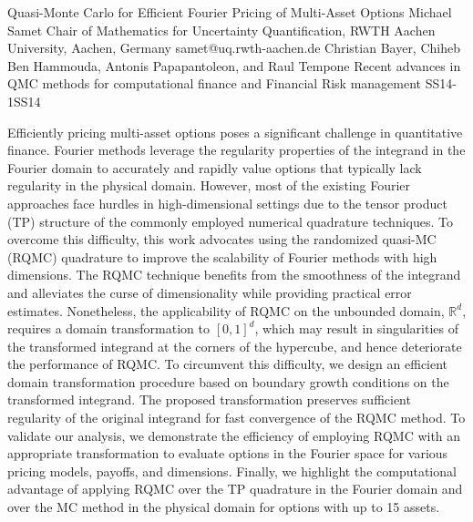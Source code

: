 \begin{talk}
  {Quasi-Monte Carlo for Efficient Fourier Pricing of Multi-Asset Options}%
  {Michael Samet}%
  {Chair of Mathematics for Uncertainty Quantification, RWTH Aachen University, Aachen, Germany}%
  {samet@uq.rwth-aachen.de}%
  {Christian Bayer, Chiheb Ben Hammouda, Antonis Papapantoleon, and Raul Tempone}%
{Recent advances in QMC methods for computational finance and Financial Risk management}
{}{SS14-1}{SS14}

			
Efficiently pricing multi-asset options poses a significant challenge in quantitative finance. Fourier methods leverage the regularity properties of the integrand in the Fourier domain to accurately and rapidly value options that typically lack regularity in the physical domain.  However, most of the existing Fourier approaches face hurdles in high-dimensional settings due to the tensor product (TP) structure of the commonly employed numerical quadrature techniques. To overcome this difficulty,  this work advocates using the randomized quasi-MC (RQMC) quadrature to improve the scalability of Fourier methods with high dimensions. The RQMC technique benefits from the smoothness of the integrand and alleviates the curse of dimensionality while providing practical error estimates. Nonetheless, the applicability of RQMC on the unbounded domain, $\mathbb{R}^d$, requires a domain transformation to $[0,1]^d$, which may result in singularities of the transformed integrand at the corners of the hypercube, and hence deteriorate the performance of RQMC. To circumvent this difficulty, we design an efficient domain transformation procedure based on boundary growth conditions on the transformed integrand. The proposed transformation preserves sufficient regularity of the original integrand for fast convergence of the RQMC method. To validate our analysis, we demonstrate the efficiency of employing RQMC with an appropriate transformation to evaluate options in the Fourier space for various pricing models, payoffs, and dimensions. Finally, we highlight the computational advantage of applying RQMC over the TP quadrature in the Fourier domain and over the MC method in the physical domain for options with up to 15 assets. \\
 

\end{talk}
